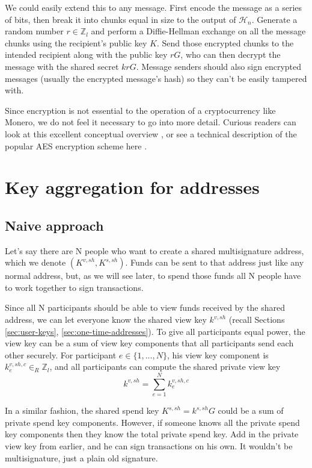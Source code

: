 We could easily extend this to any message. First encode the message as a series of bits, then break it into chunks equal in size to the output of $\mathcal{H}_n$. Generate a random number $r \in \mathbb{Z}_l$ and perform a Diffie-Hellman exchange on all the message chunks using the recipient's public key $K$. Send those encrypted chunks to the intended recipient along with the public key $r G$, who can then decrypt the message with the shared secret $k r G$. Message senders should also sign encrypted messages (usually the encrypted message's hash) so they can't be easily tampered with.


Since encryption is not essential to the operation of a cryptocurrency like Monero, we do not feel it necessary to go into more detail. Curious readers can look at this excellent conceptual overview \cite{tutorialspoint-cryptography}, or see a technical description of the popular AES encryption scheme here \cite{AES-encryption}.



\section{Key aggregation for addresses}
\label{sec:key-aggregation}

\subsection{Naive approach}
\label{sec:naive-key-aggregation}

Let's say there are N people who want to create a shared multisignature address, which we denote $(K^{v,sh},K^{s,sh})$. Funds can be sent to that address just like any normal address, but, as we will see later, to spend those funds all N people have to work together to sign transactions.

Since all N participants should be able to view funds received by the shared address, we can let everyone know the shared view key $k^{v,sh}$ (recall Sections \ref{sec:user-keys}, \ref{sec:one-time-addresses}). To give all participants equal power, the view key can be a sum of view key components that all participants send each other securely. For participant $e \in \{1,...,N\}$, his view key component is $k^{v,sh,c}_e \in_R \mathbb{Z}_l$, and all participants can compute the shared private view key
\[ k^{v,sh} = \sum^{N}_{e=1} k^{v,sh,c}_e \]

In a similar fashion, the shared spend key $K^{s,sh} = k^{s,sh} G$ could be a sum of private spend key components. However, if someone knows all the private spend key components then they know the total private spend key. Add in the private view key from earlier, and he can sign transactions on his own. It wouldn't be multisignature, just a plain old signature.

